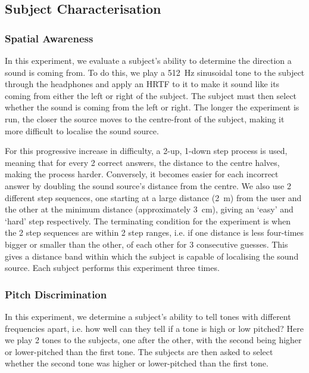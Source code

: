 \documentclass[format=sigconf, review=true, screen=true, anonymous=true]{acmart}
\begin{document}
\subsection{Subject Characterisation}

\subsubsection{Spatial Awareness}

In this experiment, we evaluate a subject's ability to determine the direction a sound is coming from. To do this, we play a \SI{512}{\hertz} sinusoidal tone to the subject through the headphones and apply an HRTF to it to make it sound like its coming from either the left or right of the subject. The subject must then select whether the sound is coming from the left or right. The longer the experiment is run, the closer the source moves to the centre-front of the subject, making it more difficult to localise the sound source. 

For this progressive increase in difficulty, a 2-up, 1-down step process is used, meaning that for every 2 correct answers, the distance to the centre halves, making the process harder. Conversely, it becomes easier for each incorrect answer by doubling the sound source's distance from the centre. We also use 2 different step sequences, one starting at a large distance (\SI{2}{\m}) from the user and the other at the minimum distance (approximately \SI{3}{\cm}), giving an `easy' and `hard' step respectively. The terminating condition for the experiment is when the 2 step sequences are within 2 step ranges, i.e. if one distance is less four-times bigger or smaller than the other, of each other for 3 consecutive guesses. This gives a distance band within which the subject is capable of localising the sound source. Each subject performs this experiment three times. 

\subsubsection{Pitch Discrimination}

In this experiment, we determine a subject's ability to tell tones with different frequencies apart, i.e. how well can they tell if a tone is high or low pitched? Here we play 2 tones to the subjects, one after the other, with the second being higher or lower-pitched than the first tone. The subjects are then asked to select whether the second tone was higher or lower-pitched than the first tone.
\end{document}
